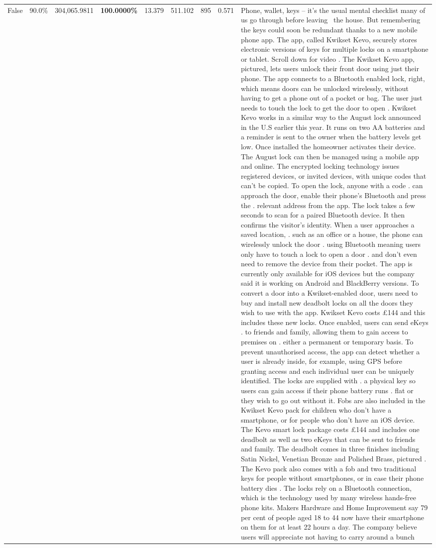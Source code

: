 \begin{table}[H]
\begin{tabular}{lllrlllll}
False & 90.0\% & 304,065.9811 & \bfseries \color{red} 100.0000\% & 13.379 & 511.102 & 895 & 0.571 & Phone, wallet, keys – it’s the usual mental checklist many of us go through before leaving  the house. But remembering the keys could soon be redundant thanks to a new mobile phone app. The app, called Kwikset Kevo, securely stores electronic versions of keys for multiple locks on a smartphone or tablet. Scroll down for video . The Kwikset Kevo app, pictured, lets users unlock their front door using just their phone. The app connects to a Bluetooth enabled lock, right, which means doors can be unlocked wirelessly, without having to get a phone out of a pocket or bag. The user just needs to touch the lock to get the door to open . Kwikset Kevo works in a similar way to the August lock announced in the U.S earlier this year. It runs on two AA batteries and a reminder is sent to the owner when the battery levels get low. Once installed the homeowner activates their device. The August lock can then be managed using a mobile app and online. The encrypted locking technology issues registered devices, or invited devices, with unique codes that can't be copied. To open the lock, anyone with a code . can approach the door, enable their phone's Bluetooth and press the . relevant address from the app. The lock takes a few seconds to scan for a paired Bluetooth device. It then confirms the visitor's identity. When a user approaches a saved location, . such as an office or a house, the phone can wirelessly unlock the door . using Bluetooth meaning users only have to touch a lock to open a door . and don't even need to remove the device from their pocket. The app is currently only available for iOS devices but the company said it is working on Android and BlackBerry versions. To convert a door into a Kwikset-enabled door, users need to buy and install new deadbolt locks on all the doors they wish to use with the app. Kwikset Kevo costs £144 and this includes these new locks. Once enabled, users can send eKeys . to friends and family, allowing them to gain access to premises on . either a permanent or temporary basis. To prevent unauthorised access, the app can detect whether a user is already inside, for example, using GPS before granting access and each individual user can be uniquely identified. The locks are supplied with . a physical key so users can gain access if their phone battery runs . flat or they wish to go out without it. Fobs are also included in the Kwikset Kevo pack for children who don't have a smartphone, or for people who don't have an iOS device. The Kevo smart lock package costs £144 and includes one deadbolt as well as two eKeys that can be sent to friends and family. The deadbolt comes in three finishes including Satin Nickel, Venetian Bronze and Polished Brass, pictured . The Kevo pack also comes with a fob and two traditional keys for people without smartphones, or in case their phone battery dies . The locks rely on a Bluetooth connection, which is the technology used by many wireless hands-free phone kits. Makers Hardware and Home Improvement say 79 per cent of people aged 18 to 44 now have their smartphone on them for at least 22 hours a day. The company believe users will appreciate not having to carry around a bunch 
\end{tabular}
\end{table}
